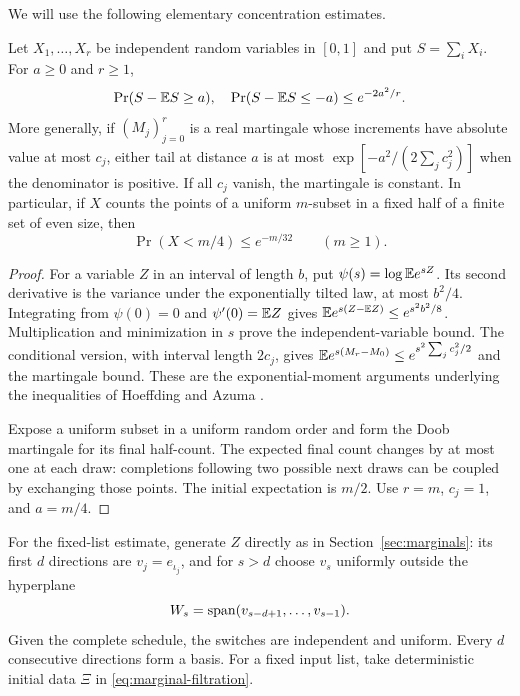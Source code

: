 We will use the following elementary concentration estimates.
\begin{lemma}\label{lem:concentration}
Let $X_1,\ldots,X_r$ be independent random variables in $[0,1]$
and put $S=\sum_iX_i$. For $a\ge0$ and $r\ge1$,
\[
 \Pr(S-\mathbb E S\ge a),\quad\Pr(S-\mathbb E S\le-a)\le e^{-2a^2/r}.
\]
More generally, if $(M_j)_{j=0}^r$ is a real martingale whose
increments have absolute value at most $c_j$, either tail at
distance $a$ is at most
$\exp[-a^2/(2\sum_jc_j^2)]$ when the denominator is positive.
If all $c_j$ vanish, the martingale is constant. In particular,
if $X$ counts the points of a uniform $m$-subset in a fixed half
of a finite set of even size, then
\[
 \Pr(X<m/4)\le e^{-m/32}\qquad(m\ge1).
\]
\end{lemma}
\begin{proof}
For a variable $Z$ in an interval of length $b$, put
$\psi(s)=\log\mathbb E e^{sZ}$. Its second derivative is the variance
under the exponentially tilted law, at most $b^2/4$. Integrating
from $\psi(0)=0$ and $\psi'(0)=\mathbb E Z$ gives
$\mathbb E e^{s(Z-\mathbb E Z)}\le e^{s^2b^2/8}$. Multiplication and
minimization in $s$ prove the independent-variable bound. The
conditional version, with interval length $2c_j$, gives
$\mathbb E e^{s(M_r-M_0)}\le e^{s^2\sum_jc_j^2/2}$ and the martingale
bound. These are the exponential-moment arguments underlying the
inequalities of Hoeffding and Azuma
\cite{hoeffding1963,azuma1967}.

Expose a uniform subset in a uniform random order and form the
Doob martingale for its final half-count. The expected final count
changes by at most one at each draw: completions following two
possible next draws can be coupled by exchanging those points.
The initial expectation is $m/2$. Use $r=m$, $c_j=1$, and
$a=m/4$.
\end{proof}

For the fixed-list estimate, generate $Z$ directly as in
Section~\ref{sec:marginals}: its first $d$ directions are
$v_j=e_{\iota_j}$, and for $s>d$ choose $v_s$ uniformly outside
the hyperplane
\begin{equation}\label{shear:eq:hyperplane}
 W_s=\operatorname{span}(v_{s-d+1},\ldots,v_{s-1}).
\end{equation}
Given the complete schedule, the switches are independent and
uniform. Every $d$ consecutive directions form a basis. For a
fixed input list, take deterministic initial data $\Xi$ in
\eqref{eq:marginal-filtration}.

